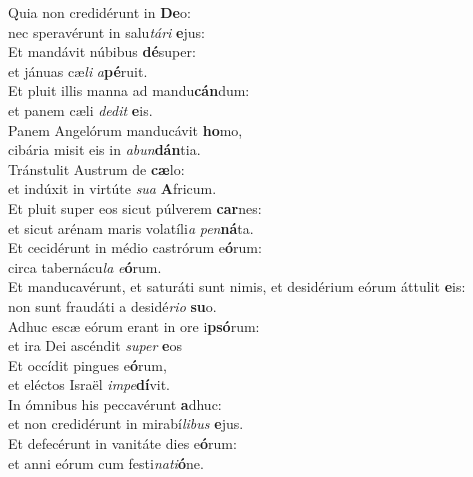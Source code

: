 \evenverse Quia non credidérunt in \textbf{De}o:~\*\\
\evenverse nec speravérunt in salu\textit{tá}\textit{ri} \textbf{e}jus:\\
\oddverse Et mandávit núbibus \textbf{dé}super:~\*\\
\oddverse et jánuas cæ\textit{li} \textit{a}\textbf{pé}ruit.\\
\evenverse Et pluit illis manna ad mandu\textbf{cán}dum:~\*\\
\evenverse et panem cæli \textit{de}\textit{dit} \textbf{e}is.\\
\oddverse Panem Angelórum manducávit \textbf{ho}mo,~\*\\
\oddverse cibária misit eis in \textit{a}\textit{bun}\textbf{dán}tia.\\
\evenverse Tránstulit Austrum de \textbf{cæ}lo:~\*\\
\evenverse et indúxit in virtúte \textit{su}\textit{a} \textbf{A}fricum.\\
\oddverse Et pluit super eos sicut púlverem \textbf{car}nes:~\*\\
\oddverse et sicut arénam maris volatíli\textit{a} \textit{pen}\textbf{ná}ta.\\
\evenverse Et cecidérunt in médio castrórum e\textbf{ó}rum:~\*\\
\evenverse circa tabernácu\textit{la} \textit{e}\textbf{ó}rum.\\
\oddverse Et manducavérunt, et saturáti sunt nimis, et desidérium eórum áttulit \textbf{e}is:~\*\\
\oddverse non sunt fraudáti a desidé\textit{ri}\textit{o} \textbf{su}o.\\
\evenverse Adhuc escæ eórum erant in ore i\textbf{psó}rum:~\*\\
\evenverse et ira Dei ascéndit \textit{su}\textit{per} \textbf{e}os\\
\oddverse Et occídit pingues e\textbf{ó}rum,~\*\\
\oddverse et eléctos Israël \textit{im}\textit{pe}\textbf{dí}vit.\\
\evenverse In ómnibus his peccavérunt \textbf{a}dhuc:~\*\\
\evenverse et non credidérunt in mirabí\textit{li}\textit{bus} \textbf{e}jus.\\
\oddverse Et defecérunt in vanitáte dies e\textbf{ó}rum:~\*\\
\oddverse et anni eórum cum festi\textit{na}\textit{ti}\textbf{ó}ne.\\
